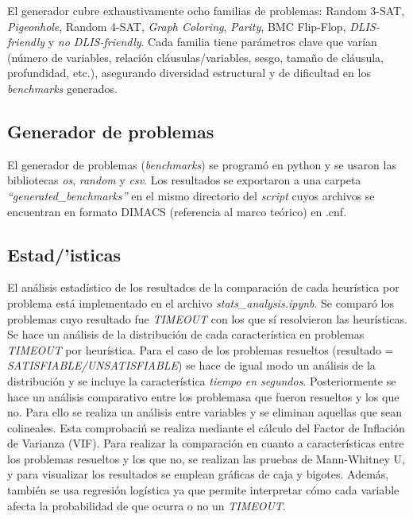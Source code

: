 El generador cubre exhaustivamente ocho familias de problemas: Random 3-SAT, \textit{Pigeonhole}, Random 4-SAT, \textit{Graph Coloring}, \textit{Parity}, BMC Flip-Flop, \textit{DLIS-friendly} y \textit{no DLIS-friendly}. Cada familia tiene parámetros clave que varían (número de variables, relación cláusulas/variables, sesgo, tamaño de cláusula, profundidad, etc.), asegurando diversidad estructural y de dificultad en los \textit{benchmarks} generados.

\subsection{Generador de problemas}
El generador de problemas (\textit{benchmarks}) se program\'o en python y se usaron las bibliotecas \textit{os}, \textit{random} y \textit{csv}. Los resultados se exportaron a una carpeta \textit{``generated\_benchmarks''} en el mismo directorio del \textit{script} cuyos archivos se encuentran en formato DIMACS (referencia al marco te\'orico) en .cnf.

\subsection{Estad/'isticas}
El an\'alisis estad\'istico de los resultados de la comparaci\'on de cada heur\'istica por problema est\'a implementado en el archivo \textit{stats\_analysis.ipynb}. Se compar\'o los problemas cuyo resultado fue \textit{TIMEOUT} con los que s\'i resolvieron las heur\'isticas. Se hace un an\'alisis de la distribuci\'on de cada caracter\'istica en problemas \textit{TIMEOUT} por heur\'istica. Para el caso de los problemas resueltos (resultado = \textit{SATISFIABLE/UNSATISFIABLE}) se hace de igual modo un an\'alisis de la distribuci\'on y se incluye la caracter\'istica \textit{tiempo en segundos}. Posteriormente se hace un an\'alisis comparativo entre los problemasa que fueron resueltos y los que no. Para ello se realiza un an\'alisis entre variables y se eliminan aquellas que sean colineales. Esta comprobaci\'n se realiza mediante el c\'alculo del Factor de Inflaci\'on de Varianza (VIF).
Para realizar la comparaci\'on en cuanto a caracter\'isticas entre los problemas resueltos y los que no, se realizan las pruebas de Mann-Whitney U, y para visualizar los resultados se emplean gr\'aficas de caja y bigotes. Adem\'as, tambi\'en se usa regresi\'on log\'istica ya que permite interpretar c\'omo cada variable afecta la probabilidad de que ocurra o no un \textit{TIMEOUT}.

